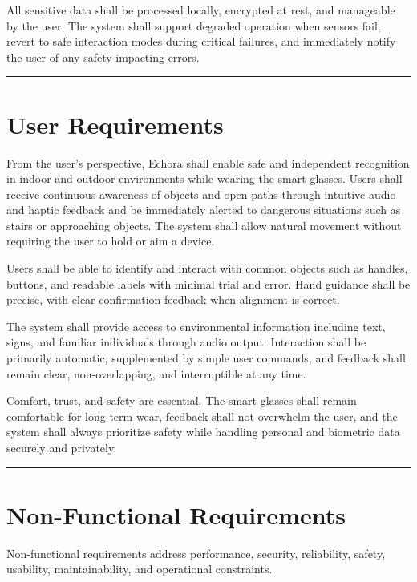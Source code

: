 All sensitive data shall be processed locally, encrypted at rest, and manageable by the user. The system shall support degraded operation when sensors fail, revert to safe interaction modes during critical failures, and immediately notify the user of any safety-impacting errors.

\par\medskip\noindent\rule{\linewidth}{0.4pt}\par\medskip

\section{User Requirements}

From the user’s perspective, Echora shall enable safe and independent recognition in indoor and outdoor environments while wearing the smart glasses. Users shall receive continuous awareness of objects and open paths through intuitive audio and haptic feedback and be immediately alerted to dangerous situations such as stairs or approaching objects. The system shall allow natural movement without requiring the user to hold or aim a device.

Users shall be able to identify and interact with common objects such as handles, buttons, and readable labels with minimal trial and error. Hand guidance shall be precise, with clear confirmation feedback when alignment is correct.

The system shall provide access to environmental information including text, signs, and familiar individuals through audio output. Interaction shall be primarily automatic, supplemented by simple user commands, and feedback shall remain clear, non-overlapping, and interruptible at any time.

Comfort, trust, and safety are essential. The smart glasses shall remain comfortable for long-term wear, feedback shall not overwhelm the user, and the system shall always prioritize safety while handling personal and biometric data securely and privately.

\par\medskip\noindent\rule{\linewidth}{0.4pt}\par\medskip

\section{Non-Functional Requirements}

Non-functional requirements address performance, security, reliability, safety, usability, maintainability, and operational constraints.

